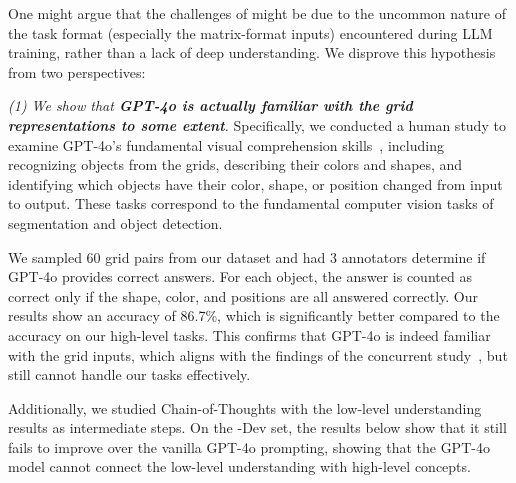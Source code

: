 \label{rq:format_analysis}
{%
One might argue that the challenges of \datasetname might be due to the uncommon nature of the task format (especially the matrix-format inputs) encountered during LLM training, rather than a lack of deep understanding. 
We disprove this hypothesis from two perspectives:

\emph{(1) We show that \textbf{GPT-4o is actually {familiar with} the grid representations to some extent}.}
Specifically, we conducted a human study to examine GPT-4o's fundamental visual comprehension skills~\cite{girshick2014rich,long2015fully,he2017mask}, including recognizing objects from the grids, describing their colors and shapes, and identifying which objects have their color, shape, or position changed from input to output. 
These tasks correspond to the fundamental computer vision tasks of segmentation and object detection. 

We sampled 60 grid pairs from our dataset and had 3 annotators determine if GPT-4o provides correct answers. For each object, the answer is counted as correct only if the shape, color, and positions are all answered correctly. Our results show an accuracy of 86.7\%, which is significantly better compared to the accuracy on our high-level tasks. This confirms that GPT-4o is indeed familiar with the grid inputs, which aligns with the findings of the concurrent study~\cite{fluid}, but still cannot handle our \datasetname tasks effectively. 

Additionally, we studied Chain-of-Thoughts with the low-level understanding results as intermediate steps. 
On the \coredatasetns-Dev set,
the results below show that it still fails to improve over the vanilla GPT-4o prompting, showing that the GPT-4o  model cannot connect the low-level understanding with high-level concepts.

\begin{table}[h!]
    \small
    \centering
    \vspace{-0.1in}
    \vspace{-0.1in}
    \vspace{-0.1in}
\end{table}


}
